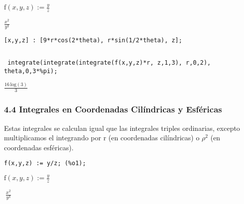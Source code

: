 \documentclass[12pt]{article}
\begin{document}

\begin{math}
\mathrm{f}\left( x,y,z\right) :=\frac{y}{z}
\end{math}

\begin{math}
\frac{{x}^{2}}{{y}^{3}}
\end{math}


\noindent

\begin{verbatim}
[x,y,z] : [9*r*cos(2*theta), r*sin(1/2*theta), z];
\end{verbatim}


\begin{math}
[9\,r\,\mathrm{cos}\left( 2\,\theta\right) ,r\,\mathrm{sin}\left( \frac{\theta}{2}\right) ,z]
\end{math}


\noindent

\begin{verbatim}
 integrate(integrate(integrate(f(x,y,z)*r, z,1,3), r,0,2), theta,0,3*%pi);
\end{verbatim}

\begin{math}
\frac{16\,\mathrm{log}\left( 3\right) }{3}
\end{math}

\subsubsection*{4.4 Integrales en Coordenadas Cilíndricas y Esféricas}
Estas integrales se calculan igual que las integrales triples ordinarias, excepto multiplicamos el integrando por r (en coordenadas cilíndricas) o $\rho^2$ (en coordenadas esféricas).
\noindent

\begin{verbatim}
f(x,y,z) := y/z; (%o1);
\end{verbatim}


\begin{math}
\mathrm{f}\left( x,y,z\right) :=\frac{y}{z}
\end{math}

\begin{math}\
\frac{{x}^{2}}{{y}^{3}}
\end{math}
\end{document}

